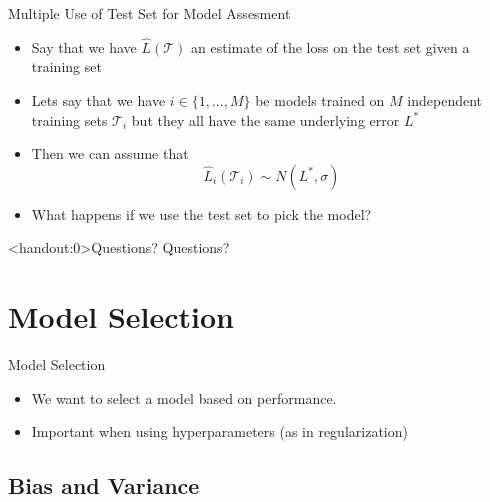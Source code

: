 \documentclass[10pt,handout]{beamer}
\begin{document}
\begin{frame}{Multiple Use of Test Set for Model Assesment}

\begin{itemize}
\item Say that we have $\hat{L}(\mathcal{T})$ an estimate of the loss on the test set given a training set
\item Lets say that we have $i \in \{1,...,M\}$ be models trained on $M$ independent training sets $\mathcal{T}_i$ but they all have the same underlying error $L^*$
\item Then we can assume that
\[
\hat{L}_i(\mathcal{T}_i) \sim N(L^*, \sigma)
\]
\item What happens if we use the test set to pick the model?
\end{itemize}

\end{frame}

\begin{frame}<handout:0>{Questions?}
Questions?
\end{frame}



\section{Model Selection}
\frame{\sectionpage}


\begin{frame}{Model Selection}
\begin{itemize}
\item We want to select a model based on performance.
\item Important when using hyperparameters (as in regularization)
\end{itemize}

\end{frame}


\subsection{Bias and Variance}
\end{document}
